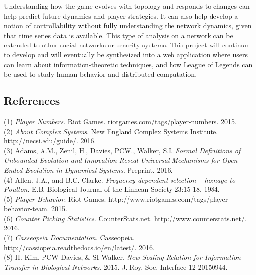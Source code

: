 \documentclass[twoside]{article}
\begin{document}
\begin{multicols}{2}
Understanding how the game evolves with topology and responds to changes can help predict future dynamics and player strategies. It can also help develop a notion of controllability without fully understanding the network dynamics, given that time series data is available. This type of analysis on a network can be extended to other social networks or security systems. This project will continue to develop and will eventually be synthesized into a web application where users can learn about information-theoretic techniques, and how League of Legends can be used to study human behavior and distributed computation.


\subsection*{References}

(1) \textit{Player Numbers}. Riot Games. riotgames.com/tags/player-numbers. 2015. 
\\
(2) \textit{About Complex Systems}. New England Complex Systems Institute. http://necsi.edu/guide/. 2016.
\\
(3) Adams, A.M., Zenil, H., Davies, PCW., Walker, S.I. \textit{Formal Definitions of Unbounded Evolution and Innovation Reveal Universal Mechanisms for Open-Ended Evolution in Dynamical Systems}. Preprint. 2016.
\\
(4) Allen, J.A., and B.C. Clarke. \textit{Frequency-dependent selection -- homage to Poulton}. E.B. Biological Journal of the Linnean Society 23:15-18. 1984.
\\
(5) \textit{Player Behavior}. Riot Games. http://www.riotgames.com/tags/player-behavior-team. 2015.
\\
(6) \textit{Counter Picking Statistics}. CounterStats.net. http://www.counterstats.net/. 2016.
\\
(7) \textit{Casseopeia Documentation}. Casseopeia. http://cassiopeia.readthedocs.io/en/latest/. 2016.
\\
(8) H. Kim, PCW Davies, \& SI Walker. \textit{New Scaling Relation for Information Transfer in Biological Networks}. 2015. J. Roy. Soc. Interface 12 20150944.


\end{multicols}
\end{document}
